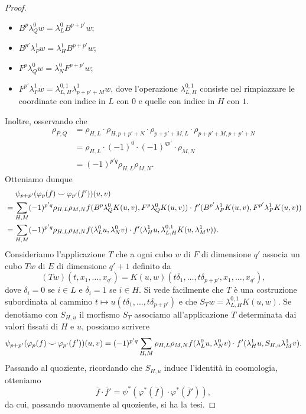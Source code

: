 \begin{proof}
\begin{itemize}
\item $B^p\lambda^0_Qw=\lambda^0_LB^{p+p'}w$;
\item $B^{p'}\lambda^1_Pw=\lambda^1_HB^{p+p'}w$;
\item $F^p\lambda^0_Qw=\lambda^0_NF^{p+p'}w$;
\item $F^{p'}\lambda^1_Pw=\lambda^{0,1}_{L,H}\lambda^1_{p+p'+M}w$, dove l'operazione $\lambda^{0,1}_{L,H}$ consiste nel rimpiazzare le coordinate con indice in $L$ con $0$ e quelle con indice in $H$ con $1$.
\end{itemize}
Inoltre, osservando che
\begin{align*}
\rho_{P,Q}&=\rho_{H,L}\cdot\rho_{H,p+p'+N}\cdot\rho_{p+p'+M,L}\cdot\rho_{p+p'+M,p+p'+N}\\
&=\rho_{H,L}\cdot (-1)^0\cdot(-1)^{qp'}\cdot\rho_{M,N}\\
&=(-1)^{p'q}\rho_{H,L}\rho_{M,N}.
\end{align*}
Otteniamo dunque
\begin{align*}
&\phantomop\psi_{p+p'}(\varphi_p(f)\cupp\varphi_{p'}(f'))(u,v)\\
&=\sum_{H,M}(-1)^{p'q}\rho_{H,L}\rho_{M,N} f(B^p\lambda^0_QK(u,v),F^p\lambda^0_QK(u,v))\cdot f'(B^{p'}\lambda^1_PK(u,v),F^{p'}\lambda^1_PK(u,v))\\
&=\sum_{H,M}(-1)^{p'q}\rho_{H,L}\rho_{M,N}f(\lambda^0_Lu,\lambda^0_Nv)\cdot f'(\lambda^1_Hu,\lambda^{0,1}_{L,H}K(u,\lambda^1_Mv)).
\end{align*}
Consideriamo l'applicazione $T$ che a ogni cubo $w$ di $F$ di dimensione $q'$ associa un cubo $Tw$ di $E$ di dimensione $q'+1$ definito da
$$
(Tw)(t,x_1,\ldots,x_{q'})=K(u,w)(t\delta_1,\ldots,t\delta_{p+p'},x_1,\ldots,x_{q'}),
$$
dove $\delta_i=0$ se $i\in L$ e $\delta_i=1$ se $i\in H$. Si vede facilmente che $T$ è una costruzione subordinata al cammino $t\mapsto u(t\delta_1,\ldots,t\delta_{p+p'})$ e che $S_Tw=\lambda^{0,1}_{L,H}K(u,w)$. Se denotiamo con $S_{H,u}$ il morfismo $S_T$ associamo all'applicazione $T$ determinata dai valori fissati di $H$ e $u$, possiamo scrivere
$$
\psi_{p+p'}(\varphi_p(f)\mathbin{\smile}\varphi_{p'}(f'))(u,v)=(-1)^{p'q}\sum_{H,M}\rho_{H,L}\rho_{M,N}f(\lambda^0_Lu,\lambda^0_Nv)\cdot f'(\lambda^1_Hu,S_{H,u}\lambda^1_Mv).
$$
Passando al quoziente, ricordando che $S_{H,u}$ induce l'identità in coomologia, otteniamo
$$
\bar{f}\cdot\bar{f}'=\psi^*(\varphi^*(\bar{f})\cdot\varphi^*(\bar{f}')),
$$
da cui, passando nuovamente al quoziente, si ha la tesi.
\end{proof}

